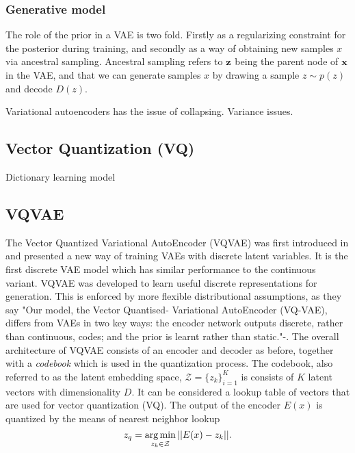 \documentclass[../../thesis.tex]{subfiles}
\begin{document}
\subsubsection{Generative model}
The role of the prior in a VAE is two fold. Firstly as a regularizing constraint for the posterior during training, and secondly as a way of obtaining new samples $x$ via ancestral sampling. Ancestral sampling refers to $\mathbf{z}$ being the parent node of $\mathbf{x}$ in the VAE, and that we can generate samples $x$ by drawing a sample $z\sim p(z)$ and decode $D(z)$. 




Variational autoencoders has the issue of collapsing. Variance issues.


\subsection{Vector Quantization (VQ)}
Dictionary learning model \cite{Gray1984VQ}

\subsection{VQVAE}
The Vector Quantized Variational AutoEncoder (VQVAE) was first introduced in \cite{VQVAE} and presented a new way of training VAEs with discrete latent variables. It is the first discrete VAE model which has similar performance to the continuous variant. VQVAE was developed to learn useful discrete representations for generation. This is enforced by more flexible distributional assumptions, as they say "Our model, the Vector Quantised-
Variational AutoEncoder (VQ-VAE), differs from VAEs in two key ways: the
encoder network outputs discrete, rather than continuous, codes; and the prior
is learnt rather than static."-\cite{VQVAE}. 
\newline
The overall architecture of VQVAE consists of an encoder and decoder as before, together with a \textit{codebook} which is used in the quantization process. The codebook, also referred to as the latent embedding space, $\mathcal{Z} = \{z_k\}_{i=1}^K$ is consists of $K$ latent vectors with dimensionality $D$. It can be considered a lookup table of vectors that are used for vector quantization (VQ). The output of the encoder $E(x)$ is quantized by the means of nearest neighbor lookup
\begin{equation}
    z_q = \operatorname*{arg\,min}_{z_k\in\mathcal{Z}} ||E(x)-z_k||.
\end{equation}
\end{document}
